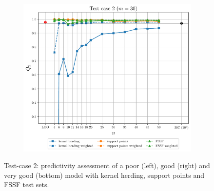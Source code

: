 \begin{figure}
\begin{subfigure}[b]{0.49\linewidth}
  \end{subfigure}
  \centering
  \begin{subfigure}[b]{0.49\linewidth}
    \centering
    \includegraphics[width=\linewidth]{./part2/figures/SIS/cosin_learnsize_30.pdf}
  \end{subfigure}
  \caption{Test-case 2: predictivity assessment of a poor (left), good (right) and very good (bottom) model with kernel herding, support points and FSSF test sets.}
  \label{fig:cosin_benchmark}
\end{figure}

